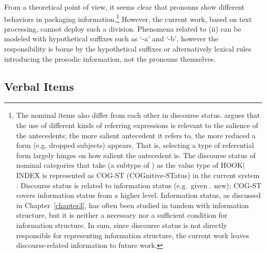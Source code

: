 From a theoretical point of view, it seems clear that pronouns show
different behaviors in packaging information.\footnote{The nominal
  items also differ from each other in discourse status.
  \citet{kaiser:09} argues that the use of different kinds of
  referring expressions is relevant to the salience of the
  antecedents; the more salient antecedent it refers to, the more
  reduced a form (e.g.  dropped subjects) appears.  That is, selecting
  a type of referential form largely hinges on how salient the
  antecedent is.  The discourse status of nominal categories that take
   (a subtype of ) as the value type of
  HOOK{$\mid$}INDEX is represented as COG-ST (COGnitive-STatus) in the
  current \lingo {} system \citep{bender:goss:08}.
  Discourse status is related to information status (e.g.\ given
  \vs. new); COG-ST covers information status from a higher
  level. Information status, as discussed in Chapter~\ref{chapter3},
  has often been studied in tandem with information structure, but it
  is neither a necessary nor a sufficient condition for information
  structure.  In sum, since discourse status is not directly
  responsible for representing information structure, the current work
  leaves discourse-related information to future work.} However, the
current work, based on text processing, cannot deploy such a
division. Phenomena related to (ii) can be modeled with hypothetical
suffixes such as `-a' and `-b', however the responsibility is borne by
the hypothetical suffixes or alternatively lexical rules introducing
the prosodic information, not the pronouns themselves.





\subsection{Verbal Items}
\label{10:ssec:verbal}


